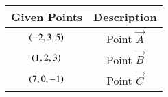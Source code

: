 \begin{tabular}[12pt]{ |c| c|}
    \hline
    \textbf{Given Points} & \textbf{Description} \\ 
    \hline
    $\left(-2,3,5\right)$ & Point $\vec{A}$ \\
    \hline 
    $\left(1,2,3\right)$ & Point $\vec{B}$\\
    \hline
    $\left(7,0,-1\right)$ & Point $\vec{C}$\\
    \hline 
    \end{tabular}
